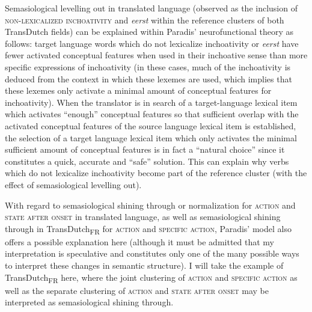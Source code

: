 Semasiological levelling out in translated language (observed as the inclusion of \textsc{non-lexicalized inchoativity} and \textit{eerst} within the reference clusters of both TransDutch fields) can be explained within Paradis’ neurofunctional theory as follows: target language words which do not lexicalize inchoativity or \textit{eerst} have fewer activated conceptual features when used in their inchoative sense than more specific expressions of inchoativity (in these cases, much of the inchoativity is deduced from the context in which these lexemes are used, which implies that these lexemes only activate a minimal amount of conceptual features for inchoativity). When the translator is in search of a target-language lexical item which activates ``enough'' conceptual features so that sufficient overlap with the activated conceptual features of the source language lexical item is established, the selection of a target language lexical item which only activates the minimal sufficient amount of conceptual features is in fact a ``natural choice'' since it constitutes a quick, accurate and ``safe'' solution. This can explain why verbs which do not lexicalize inchoativity become part of the reference cluster (with the effect of semasiological levelling out).

With regard to semasiological shining through or normalization for \textsc{action} and \textsc{state after onset} in translated language, as well as semasiological shining through in TransDutch\textsubscript{FR} for \textsc{action} and \textsc{specific} \textsc{action}, Paradis’ model also offers a possible explanation here (although it must be admitted that my interpretation is speculative and constitutes only one of the many possible ways to interpret these changes in semantic structure). I will take the example of TransDutch\textsubscript{FR} here, where the joint clustering of \textsc{action} and \textsc{specific} \textsc{action} as well as the separate clustering of \textsc{action} and \textsc{state after onset} may be interpreted as semasiological shining through.


